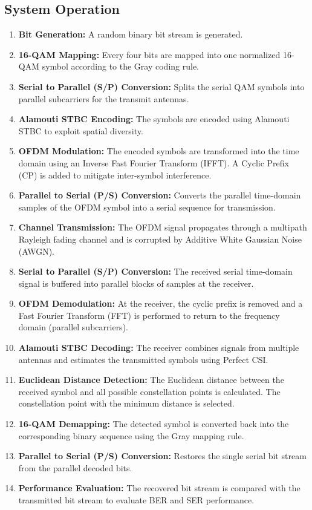 \documentclass[a4paper]{article}
\begin{document}
\subsection{System Operation}
\begin{enumerate}
    \item \textbf{Bit Generation:} A random binary bit stream is generated.
    \item \textbf{16-QAM Mapping:} Every four bits are mapped into one normalized 16-QAM symbol according to the Gray coding rule.
    \item \textbf{Serial to Parallel (S/P) Conversion:} Splits the serial QAM symbols into parallel subcarriers for the transmit antennas.
    \item \textbf{Alamouti STBC Encoding:} The symbols are encoded using Alamouti STBC to exploit spatial diversity.
    \item \textbf{OFDM Modulation:} The encoded symbols are transformed into the time domain using an Inverse Fast Fourier Transform (IFFT). A Cyclic Prefix (CP) is added to mitigate inter-symbol interference.
    \item \textbf{Parallel to Serial (P/S) Conversion:} Converts the parallel time-domain samples of the OFDM symbol into a serial sequence for transmission.
    \item \textbf{Channel Transmission:} The OFDM signal propagates through a multipath Rayleigh fading channel and is corrupted by Additive White Gaussian Noise (AWGN).
    \item \textbf{Serial to Parallel (S/P) Conversion:} The received serial time-domain signal is buffered into parallel blocks of samples at the receiver.
    \item \textbf{OFDM Demodulation:} At the receiver, the cyclic prefix is removed and a Fast Fourier Transform (FFT) is performed to return to the frequency domain (parallel subcarriers).
    \item \textbf{Alamouti STBC Decoding:} The receiver combines signals from multiple antennas and estimates the transmitted symbols using Perfect CSI.
    \item \textbf{Euclidean Distance Detection:} The Euclidean distance between the received symbol and all possible constellation points is calculated. The constellation point with the minimum distance is selected.
    \item \textbf{16-QAM Demapping:} The detected symbol is converted back into the corresponding binary sequence using the Gray mapping rule.
    \item \textbf{Parallel to Serial (P/S) Conversion:} Restores the single serial bit stream from the parallel decoded bits.
    \item \textbf{Performance Evaluation:} The recovered bit stream is compared with the transmitted bit stream to evaluate BER and SER performance.
\end{enumerate}
\end{document}
